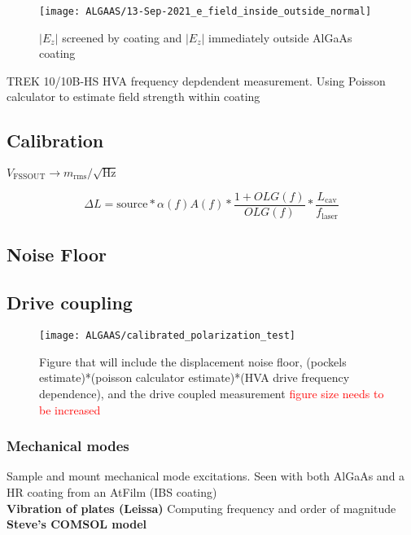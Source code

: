 \begin{figure}[H]
\texttt{[image: ALGAAS/13-Sep-2021\_e\_field\_inside\_outside\_normal]}
\caption{$|E_z|$ screened by coating and $|E_z|$ immediately outside AlGaAs coating}
\label{fig:Ez}
\end{figure}

TREK 10/10B-HS HVA frequency depdendent measurement. Using Poisson calculator to estimate field strength within coating

\subsection{Calibration}

$V_\mathrm{FSSOUT} \rightarrow m_\mathrm{rms}/\sqrt{\mathrm{Hz}}$

$$\Delta L = \mathrm{source}*\alpha(f) A(f)*\frac{1+OLG(f)}{OLG(f)}*\frac{L_\mathrm{cav}}{f_\mathrm{laser}}$$

\subsection{Noise Floor}

\subsection{Drive coupling}

\begin{figure}[H]
\texttt{[image: ALGAAS/calibrated\_polarization\_test]}
\caption{Figure that will include the displacement noise floor, (pockels estimate)*(poisson calculator estimate)*(HVA drive frequency dependence), and the drive coupled measurement \textcolor{red}{figure size needs to be increased}}
\label{fig:measurement_sum}
\end{figure}

\subsubsection{Mechanical modes}
Sample and mount mechanical mode excitations. Seen with both AlGaAs and a HR coating from an AtFilm (IBS coating)
\\
\textbf{Vibration of plates (Leissa)}
Computing frequency and order of magnitude
\\
\textbf{Steve's COMSOL model}
